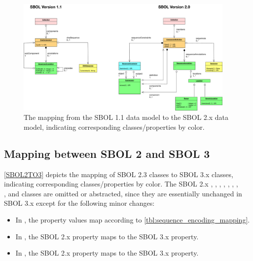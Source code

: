 \begin{figure}[htp]
\begin{center}
  \includegraphics[width=0.95\textwidth]{images/sbol_v1_to_v2}
\end{center}
\caption{\label{SBOL1TO2}The mapping from the SBOL 1.1 data model to the SBOL 2.x  data model, indicating corresponding classes/properties by color.}
\end{figure}



\subsection{Mapping between SBOL 2 and SBOL 3}

\ref{SBOL2TO3} depicts the mapping of SBOL 2.3 classes to SBOL 3.x classes, indicating corresponding classes/properties by color.   
The SBOL 2.x , , , , , , , \\
, and   classes are omitted or abstracted, since they are essentially unchanged in SBOL 3.x except for the following minor changes:
\begin{itemize}
\item In , the  property values map according to  \ref{tbl:sequence_encoding_mapping}. 
\item In , the SBOL 2.x  property maps to the SBOL 3.x  property.
\item In , the SBOL 2.x  property maps to the SBOL 3.x  property.
\end{itemize}

